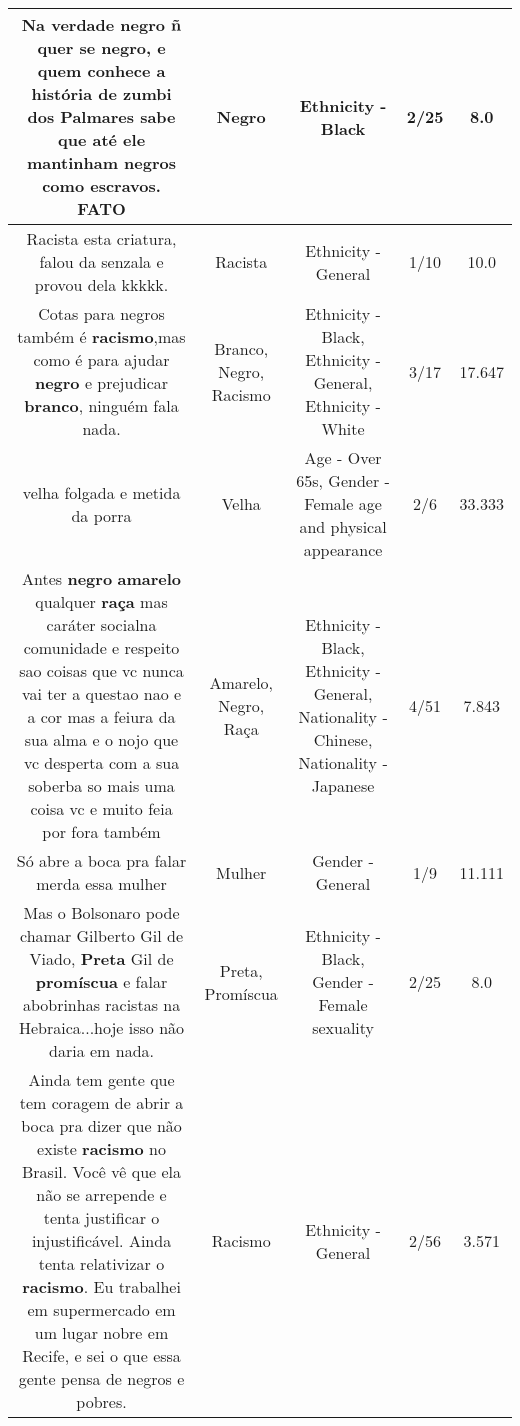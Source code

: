 \documentclass[11pt]{article}
\newlength\mylength
\begin{document}
\begin{center}
\begin{longtable}{|C{.65\mylength}|C{.30\mylength}|C{.12\mylength}|C{.12\mylength}|C{.12\mylength}|}
  \small Na verdade \textbf{negro} ñ quer se \textbf{negro}, e quem conhece a história de zumbi dos Palmares sabe que até ele mantinham negros como escravos. FATO\normalsize   & Negro & Ethnicity - Black & 2/25 & 8.0 \\  \hline
  \small Racista esta criatura, falou da senzala e provou dela kkkkk.\normalsize   & Racista & Ethnicity - General & 1/10 & 10.0 \\  \hline
  \small Cotas para negros também é \textbf{racismo},mas como é para ajudar \textbf{negro} e prejudicar \textbf{branco}, ninguém fala nada.\normalsize   & Branco, Negro, Racismo & Ethnicity - Black, Ethnicity - General, Ethnicity - White & 3/17 & 17.647 \\  \hline
  \small velha folgada e metida da porra\normalsize   & Velha & Age - Over 65s, Gender - Female age and physical appearance & 2/6 & 33.333 \\  \hline
  \small Antes \textbf{negro} \textbf{a\textbf{marelo}} qualquer \textbf{raça} mas caráter socialna comunidade e respeito sao coisas que vc nunca vai ter a questao nao e a cor mas a feiura da sua alma e o nojo que vc desperta com a sua soberba so mais uma coisa vc e muito feia por fora também\normalsize   & Amarelo, Negro, Raça & Ethnicity - Black, Ethnicity - General, Nationality - Chinese, Nationality - Japanese & 4/51 & 7.843 \\  \hline
  \small Só abre a boca pra falar merda essa mulher\normalsize   & Mulher & Gender - General & 1/9 & 11.111 \\  \hline
  \small Mas o Bolsonaro pode chamar Gilberto Gil de Viado, \textbf{Preta} Gil de \textbf{promíscua} e falar abobrinhas racistas na Hebraica...hoje isso não daria em nada.\normalsize   & Preta, Promíscua & Ethnicity - Black, Gender - Female sexuality & 2/25 & 8.0 \\  \hline
  \small Ainda tem gente que tem coragem de abrir a boca pra dizer que não existe \textbf{racismo} no Brasil. Você vê que ela não se arrepende e tenta justificar o injustificável. Ainda tenta relativizar o \textbf{racismo}. Eu trabalhei em supermercado em um lugar nobre em Recife, e sei o que essa gente pensa de negros e pobres.\normalsize   & Racismo & Ethnicity - General & 2/56 & 3.571 \\  \hline

\end{longtable}
\end{center}
\end{document}
